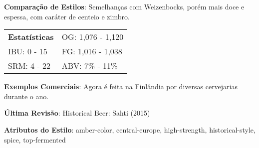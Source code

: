 \textbf{Comparação de Estilos}: Semelhanças com Weizenbocks, porém mais doce e espessa, com caráter de centeio e zimbro.

\begin{tabular}{@{}p{35mm}p{35mm}@{}}
  \textbf{Estatísticas} & OG: 1,076 - 1,120 \\
  IBU: 0 - 15  & FG: 1,016 - 1,038  \\
  SRM: 4 - 22 & ABV: 7\% - 11\%
\end{tabular}

\textbf{Exemplos Comerciais}: Agora é feita na Finlândia por diversas cervejarias durante o ano.

\textbf{Última Revisão}: Historical Beer: Sahti (2015)

\textbf{Atributos do Estilo}: amber-color, central-europe, high-strength, historical-style, spice, top-fermented
